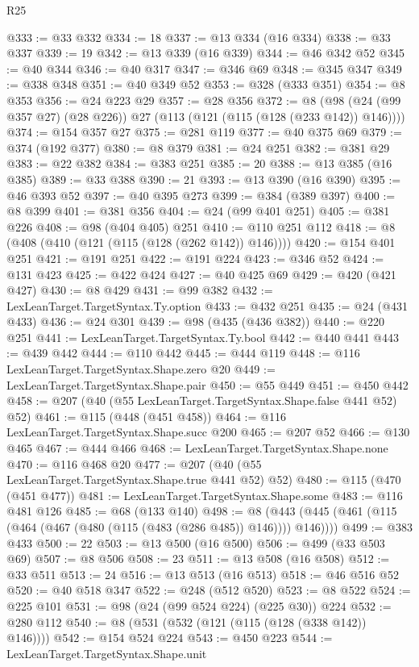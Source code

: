 \begin{lexlean}{R25}
\begin{coremodule}
{{{{{{{{{{{{{{{{{{{{{{{{{{{{{{{{{{{{{{{{{{{{{{{{{{{{{@333 := @33 @332
@334 := 18
@337 := @13 @334 (@16 @334)
@338 := @33 @337
@339 := 19
@342 := @13 @339 (@16 @339)
@344 := @46 @342 @52
@345 := @40 @344
@346 := @40 @317
@347 := @346 @69
@348 := @345 @347
@349 := @338 @348
@351 := @40 @349 @52
@353 := @328 (@333 @351)
@354 := @8 @353
@356 := @24 @223 @29
@357 := @28 @356
@372 := @8 (@98 (@24 (@99 @357 @27) (@28 @226)) @27 (@113 (@121 (@115 (@128 (@233 @142)) @146))))
@374 := @154 @357 @27
@375 := @281 @119
@377 := @40 @375 @69
@379 := @374 (@192 @377)
@380 := @8 @379
@381 := @24 @251
@382 := @381 @29
@383 := @22 @382
@384 := @383 @251
@385 := 20
@388 := @13 @385 (@16 @385)
@389 := @33 @388
@390 := 21
@393 := @13 @390 (@16 @390)
@395 := @46 @393 @52
@397 := @40 @395 @273
@399 := @384 (@389 @397)
@400 := @8 @399
@401 := @381 @356
@404 := @24 (@99 @401 @251)
@405 := @381 @226
@408 := @98 (@404 @405) @251
@410 := @110 @251 @112
@418 := @8 (@408 (@410 (@121 (@115 (@128 (@262 @142)) @146))))
@420 := @154 @401 @251
@421 := @191 @251
@422 := @191 @224
@423 := @346 @52
@424 := @131 @423
@425 := @422 @424
@427 := @40 @425 @69
@429 := @420 (@421 @427)
@430 := @8 @429
@431 := @99 @382
@432 := LexLeanTarget.TargetSyntax.Ty.option
@433 := @432 @251
@435 := @24 (@431 @433)
@436 := @24 @301
@439 := @98 (@435 (@436 @382))
@440 := @220 @251
@441 := LexLeanTarget.TargetSyntax.Ty.bool
@442 := @440 @441
@443 := @439 @442
@444 := @110 @442
@445 := @444 @119
@448 := @116 LexLeanTarget.TargetSyntax.Shape.zero @20
@449 := LexLeanTarget.TargetSyntax.Shape.pair
@450 := @55 @449
@451 := @450 @442
@458 := @207 (@40 (@55 LexLeanTarget.TargetSyntax.Shape.false @441 @52) @52)
@461 := @115 (@448 (@451 @458))
@464 := @116 LexLeanTarget.TargetSyntax.Shape.succ @200
@465 := @207 @52
@466 := @130 @465
@467 := @444 @466
@468 := LexLeanTarget.TargetSyntax.Shape.none
@470 := @116 @468 @20
@477 := @207 (@40 (@55 LexLeanTarget.TargetSyntax.Shape.true @441 @52) @52)
@480 := @115 (@470 (@451 @477))
@481 := LexLeanTarget.TargetSyntax.Shape.some
@483 := @116 @481 @126
@485 := @68 (@133 @140)
@498 := @8 (@443 (@445 (@461 (@115 (@464 (@467 (@480 (@115 (@483 (@286 @485)) @146)))) @146))))
@499 := @383 @433
@500 := 22
@503 := @13 @500 (@16 @500)
@506 := @499 (@33 @503 @69)
@507 := @8 @506
@508 := 23
@511 := @13 @508 (@16 @508)
@512 := @33 @511
@513 := 24
@516 := @13 @513 (@16 @513)
@518 := @46 @516 @52
@520 := @40 @518 @347
@522 := @248 (@512 @520)
@523 := @8 @522
@524 := @225 @101
@531 := @98 (@24 (@99 @524 @224) (@225 @30)) @224
@532 := @280 @112
@540 := @8 (@531 (@532 (@121 (@115 (@128 (@338 @142)) @146))))
@542 := @154 @524 @224
@543 := @450 @223
@544 := LexLeanTarget.TargetSyntax.Shape.unit
}}}}}}}}}}}}}}}}}}}}}}}}}}}}}}}}}}}}}}}}}}}}}}}}}}}}}
\end{coremodule}
\end{lexlean}
